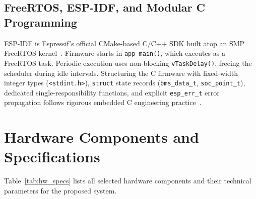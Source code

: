 \documentclass[12pt,a4paper]{article}
\begin{document}
\subsection{FreeRTOS, ESP-IDF, and Modular C Programming}
ESP-IDF is Espressif's official CMake-based C/C++ SDK built atop an SMP FreeRTOS kernel~\cite{espressif_espidf, barry_freertos}. Firmware starts in \texttt{app\_main()}, which executes as a FreeRTOS task. Periodic execution uses non-blocking \texttt{vTaskDelay()}, freeing the scheduler during idle intervals. Structuring the C firmware with fixed-width integer types (\texttt{<stdint.h>}), \texttt{struct} state records (\texttt{bms\_data\_t}, \texttt{soc\_point\_t}), dedicated single-responsibility functions, and explicit \texttt{esp\_err\_t} error propagation follows rigorous embedded C engineering practice~\cite{kr_c}.

\section{Hardware Components and Specifications}
\label{sec:hardware_specs}

Table~\ref{tab:hw_specs} lists all selected hardware components and their technical parameters for the proposed system.
\end{document}
